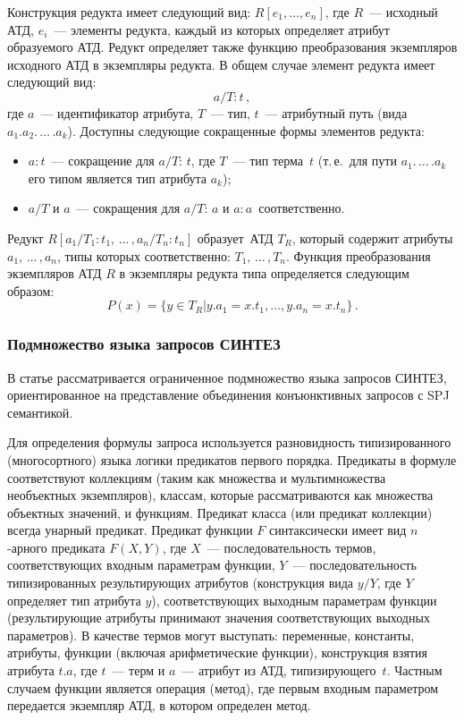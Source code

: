 \begin{multicols}{2}
     Конструкция редукта имеет следующий вид: $R[e_1, \ldots , e_n]$, где $R$~---
исходный АТД, $e_i$~--- элементы редукта, каждый из которых определяет атрибут
образуемого АТД. Редукт определяет также функцию преобразования экземпляров
исходного АТД в экземпляры редукта. В общем случае элемент редукта имеет следующий
вид:
     $$
a/T:t\,,
$$
где $a$~--- идентификатор атрибута, $T$~--- тип, $t$~--- атрибутный путь (вида
$a_1.a_2.\,\ldots\,.a_k$). Доступны следующие сокращенные формы элементов ре\-дукта:
     \begin{itemize}
\item $a:t$~--- сокращение для $a/T{:\,t}$, где $T$~--- тип терма~$t$ (т.\,е.\ для пути $a_1.\,\ldots\,.a_k$ его типом является тип атрибута $a_k$);
\item $a/T$ и $a$~--- сокращения для $a/T{:\,a}$ и $a:a$~со\-от\-вет\-ст\-венно.
\end{itemize}

     Редукт $R[a_1/T_1\!:t_1,\,\ldots\,,a_n/T_n\!:t_n]$ образует~АТД $T_R$, который содержит
атрибуты $a_1,\,\ldots\,,a_n$, типы которых соответственно: $T_1,\,\ldots\,,T_n$. Функция
преобразования экземпляров АТД $R$ в экземпляры редукта типа определяется
следующим образом:
$$
P(x) = \{y\in  T_R \vert  y.a_1=x.t_1, \ldots , y.a_n=x.t_n\}\,.
$$

\subsubsection{Подмножество языка запросов СИНТЕЗ}

\smallskip

     В статье рассматривается ограниченное подмножество языка запросов
СИНТЕЗ, ориентированное на представление объединения конъюнктивных запросов с SPJ
семантикой.

Для определения формулы запроса используется разновидность
типизированного (многосортного) языка логики предикатов
первого порядка. Предикаты в формуле
соответствуют коллекциям (таким как множества и мультимножества необъектных
экземпляров), классам, которые рассматриваются как множества объектных значений, и
функциям. Предикат класса (или предикат коллекции) всегда унарный предикат. Предикат
функции $F$ синтаксически имеет вид $n$-арного предиката $F(X,Y)$, где $X$~---
последовательность термов, соответствующих входным параметрам функции, $Y$~---
последовательность типизированных результирующих атрибутов (конструкция вида
$y/Y$, где $Y$ определяет тип атрибута $y$), соответствующих выходным параметрам
функции (результирующие атрибуты принимают значения соответствующих выходных
параметров). В качестве термов могут выступать: переменные, константы, атрибуты,
функции (включая арифметические функции), конструкция взятия атрибута $t.a$, где
$t$~--- терм и $a$~--- атрибут из АТД, типизирующего~$t$. Частным случаем функции
является операция (метод), где первым входным параметром передается экземпляр АТД, в
котором определен метод.


\end{multicols}
